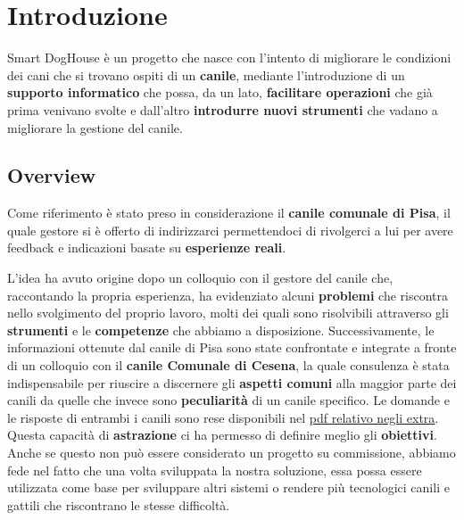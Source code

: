 

\chapter{Introduzione}
Smart DogHouse è un progetto che nasce con l'intento di migliorare le condizioni dei cani che si trovano ospiti di un \textbf{canile}, mediante l'introduzione di un \textbf{supporto informatico} che possa, da un lato, \textbf{facilitare operazioni} che già prima venivano svolte e dall'altro \textbf{introdurre nuovi strumenti} che vadano a migliorare la gestione del canile.

\section{Overview}
Come riferimento è stato preso in considerazione il \textbf{ canile comunale di Pisa}, il quale gestore si è offerto di indirizzarci permettendoci di rivolgerci a lui per avere feedback e indicazioni basate su \textbf{esperienze reali}. 

L'idea ha avuto origine dopo un colloquio con il gestore del canile che, raccontando la propria esperienza, ha evidenziato alcuni \textbf{problemi} che riscontra nello svolgimento del proprio lavoro, molti dei quali sono risolvibili attraverso gli \textbf{strumenti} e le \textbf{competenze} che abbiamo a disposizione.
Successivamente, le informazioni ottenute dal canile di Pisa sono state confrontate e integrate a fronte di un colloquio con il \textbf{canile Comunale di Cesena}, la quale consulenza è stata indispensabile per riuscire a discernere gli \textbf{aspetti comuni }alla maggior parte dei canili da quelle che invece sono \textbf{peculiarità} di un canile specifico. 
Le domande e le risposte di entrambi i canili sono rese disponibili nel \href{https://github.com/SmartDogHouse/SmartDogHouse-Report/tree/main/Extra/Domande_Canile.pdf}{pdf relativo negli extra}.
Questa capacità di \textbf{astrazione} ci ha permesso di definire meglio gli \textbf{obiettivi}. 
Anche se questo non può essere considerato un progetto su commissione, abbiamo fede nel fatto che una volta sviluppata la nostra soluzione, essa possa essere utilizzata come base per sviluppare altri sistemi o rendere più tecnologici canili e gattili che riscontrano le stesse difficoltà.

